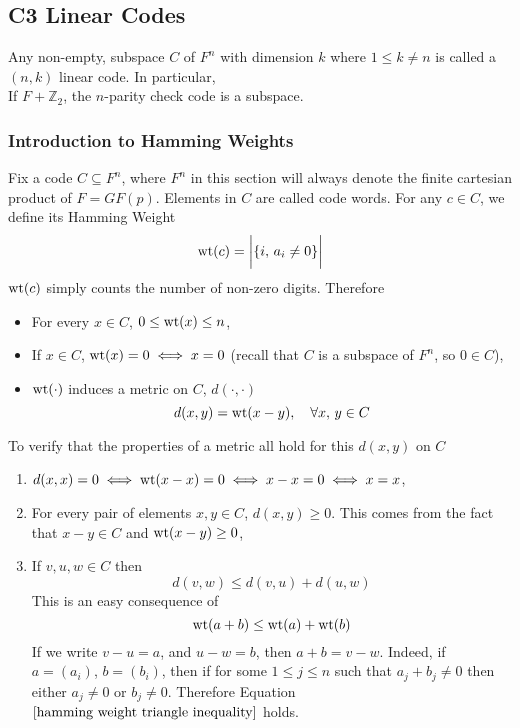 \documentclass[../../main.tex]{subfiles}
\begin{document}
\subsection{C3 Linear Codes}
\begin{definition}
    Any non-empty, subspace $C$ of $F^n$ with dimension $k$ where $1\leq k\neq n$ is called a $(n,k)$ linear code. In particular,\\
    
    If $F+\mathbb{Z}_2$, the $n$-parity check code is a subspace.
\end{definition}

\subsubsection{Introduction to Hamming Weights}
Fix a code $C\subseteq F^n$, where $F^n$ in this section will always denote the finite cartesian product of $F=GF(p)$. Elements in $C$ are called code words. For any $c\in C$, we define its Hamming Weight 
\[
\operatorname{wt}(c) = \biggl|\{i,\,a_i\neq 0\}\biggr|
\]
$\operatorname{wt}(c)$ simply counts the number of non-zero digits. Therefore
\begin{itemize}
    \item For every $x\in C$, $0\leq \operatorname{wt}(x)\leq n$,
    \item If $x\in C$, $\operatorname{wt}(x)=0\iff x=0$ (recall that $C$ is a subspace of $F^n$, so $0\in C$),
    \item $\operatorname{wt}(\cdot)$ induces a metric on $C$, $d(\cdot,\cdot)$ 
    \[
    d(x,y)=\operatorname{wt}(x-y),\quad\forall x,\,y\in C
    \]
\end{itemize}
To verify that the properties of a metric all hold for this $d(x,y)$ on $C$ 
\begin{enumerate}
    \item $d(x,x)=0\iff \operatorname{wt}(x-x)=0\iff x-x=0\iff x=x$,
    \item For every pair of elements $x,y\in C$, $d(x,y)\geq 0$. This comes from the fact that $x-y\in C$ and $\operatorname{wt}(x-y)\geq 0$,
    \item If $v,u,w\in C$ then
    \[
    d(v,w)\leq d(v,u) + d(u,w)
    \]
    This is an easy consequence of 
    \begin{equation}\label{hamming weight triangle inequality}
    \operatorname{wt}(a+b)\leq \operatorname{wt}(a)+\operatorname{wt}(b)
    \end{equation}
    If we write $v-u = a$, and $u-w = b$, then $a+b = v-w$. Indeed, if $a = (a_i)$, $b=(b_i)$, then if for some $1\leq j\leq n$ such that $a_j + b_j\neq 0$ then either $a_j\neq 0$ or $b_j\neq 0$. Therefore Equation $\eqref{hamming weight triangle inequality}$ holds.
\end{enumerate}
\end{document}
